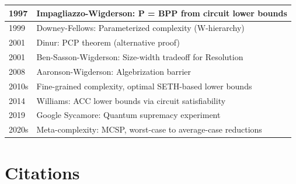 \begin{tabularx}{\linewidth}{|l|X|}
 \hline
1997 & Impagliazzo-Wigderson: P = BPP from circuit lower bounds \\
 \hline
1999 & Downey-Fellows: Parameterized complexity (W-hierarchy) \\
 \hline
2001 & Dinur: PCP theorem (alternative proof) \\
 \hline
2001 & Ben-Sasson-Wigderson: Size-width tradeoff for Resolution \\
 \hline
2008 & Aaronson-Wigderson: Algebrization barrier \\
 \hline
2010s & Fine-grained complexity, optimal SETH-based lower bounds \\
 \hline
2014 & Williams: ACC lower bounds via circuit satisfiability \\
 \hline
2019 & Google Sycamore: Quantum supremacy experiment \\
 \hline
2020s & Meta-complexity: MCSP, worst-case to average-case reductions \\
 \hline
\end{tabularx}

\section{Citations}
\label{sec:complexity:citations}

